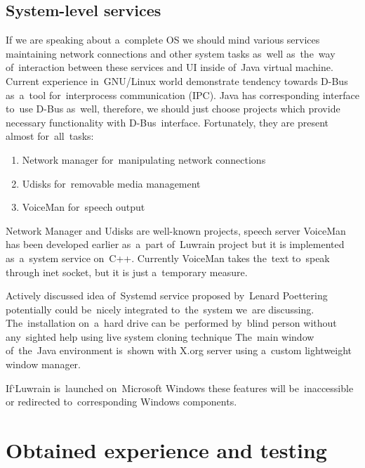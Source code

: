 \documentclass{acm_proc_article-sp}
\begin{document}
\subsection{System-level services}

If we are speaking about a~complete OS 
we should mind various services maintaining network connections and other system tasks 
as~well as~the~way of~interaction between these services and UI inside of~Java virtual machine.
Current experience in~GNU/Linux world demonstrate tendency towards  
D-Bus \cite{dbus} as~a~tool for~interprocess communication (IPC).
Java has corresponding interface to~use D-Bus as~well,
therefore, we should just choose projects 
which provide necessary functionality with D-Bus~interface.
Fortunately, they are present almost for~all~tasks:

\begin{enumerate} 

\item{
Network manager \cite{nm} for~manipulating network connections
}

\item {
Udisks \cite{udisks} for~removable media management
}

\item {
VoiceMan \cite{voiceman} for~speech output
}

\end{enumerate}

Network Manager and Udisks are well-known projects,
speech server VoiceMan has been developed earlier as~a~part of~Luwrain project 
but it is implemented as~a~system service on~C++.
Currently VoiceMan takes the~text to~speak through inet socket,
but it is just a~temporary measure. 

Actively discussed idea of~Systemd service \cite{systemd}
proposed by~Lenard Poettering 
potentially could be~nicely integrated to~the~system we~are discussing.
The~installation on~a~hard drive can be~performed by~blind person without any~sighted help 
using live system cloning technique \cite{livecdclone}
The~main window of~the~Java environment is~shown with X.org server \cite{xorg}
using a~custom lightweight window manager.

If`Luwrain is~launched on~Microsoft Windows these features will be~inaccessible 
or redirected to~corresponding Windows components.

\section{Obtained experience and testing}
\end{document}
